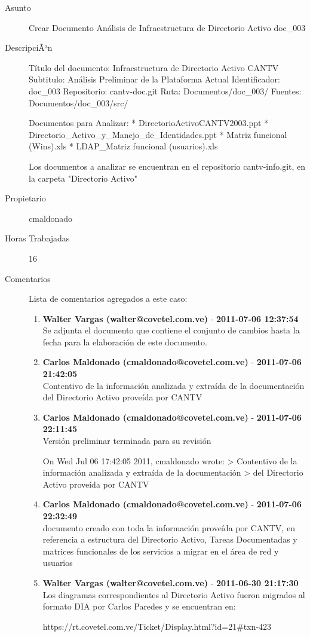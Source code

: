 \begin{description}

\item[Asunto] Crear Documento Análisis de Infraestructura de Directorio Activo doc_003\item[DescripciÃ³n] Título del documento: Infraestructura de Directorio Activo CANTV
Subtitulo: Análisis Preliminar de la Plataforma Actual
Identificador: doc_003
Repositorio: cantv-doc.git
Ruta: Documentos/doc_003/
Fuentes: Documentos/doc_003/src/

Documentos para Analizar:
* DirectorioActivoCANTV2003.ppt * Directorio_Activo_y_Manejo_de_Identidades.ppt
* Matriz funcional (Wins).xls * LDAP_Matriz funcional (usuarios).xls

Los documentos a analizar se encuentran en el repositorio cantv-info.git, en la
carpeta "Directorio Activo"\item[Propietario] cmaldonado\item[Horas Trabajadas] 16

\item[Comentarios] Lista de comentarios agregados a este caso:  
\begin{enumerate}
        \item {\bfseries Walter Vargas (walter@covetel.com.ve)  } - {\bfseries 2011-07-06 12:37:54} \\ Se adjunta el documento que contiene el conjunto de cambios hasta la fecha para
la elaboración de este documento.        \item {\bfseries Carlos Maldonado (cmaldonado@covetel.com.ve)  } - {\bfseries 2011-07-06 21:42:05} \\ Contentivo de la información analizada y extraída de la documentación del Directorio Activo proveída por CANTV        \item {\bfseries Carlos Maldonado (cmaldonado@covetel.com.ve)  } - {\bfseries 2011-07-06 22:11:45} \\ Versión preliminar terminada para su revisión

On Wed Jul 06 17:42:05 2011, cmaldonado wrote:
> Contentivo de la información analizada y extraída de la documentación
> del Directorio Activo proveída por CANTV        \item {\bfseries Carlos Maldonado (cmaldonado@covetel.com.ve)  } - {\bfseries 2011-07-06 22:32:49} \\ documento creado con toda la información proveída por CANTV, en referencia a estructura del Directorio Activo, Tareas Documentadas y matrices funcionales de los servicios a migrar en el área de red y usuarios        \item {\bfseries Walter Vargas (walter@covetel.com.ve)  } - {\bfseries 2011-06-30 21:17:30} \\ Los diagramas correspondientes al Directorio Activo fueron migrados al formato
DIA por Carlos Paredes y se encuentran en:

https://rt.covetel.com.ve/Ticket/Display.html?id=21#txn-423    \end{enumerate}

\end{description}

